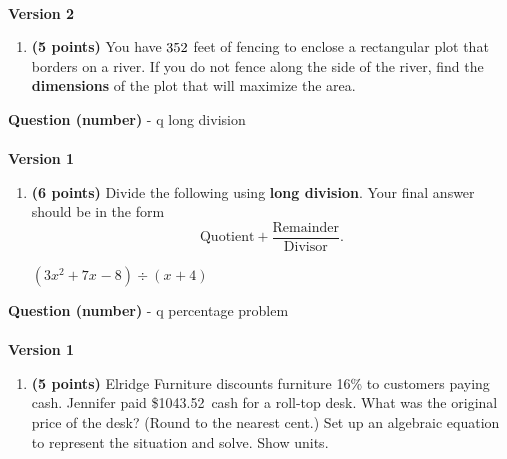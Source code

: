 \documentclass[12pt]{amsart}
\begin{document}
\begin{enumerate}[resume]
  
\vfill \vfill \vfill
 \end{enumerate}$ $ \\ {\bf Version 2} \\\begin{enumerate}[resume]
\item {\bf (5 points)} 
 You have $352$ feet of fencing to enclose a rectangular plot that borders on a river. If you do not fence along the side of the river, find the \textbf{dimensions} of the plot that will maximize the area. \\

  
\vfill \vfill \vfill
 \end{enumerate}\newpage\def \a{4}\def \b{3}\def \c{-5}\def \r{12}\def \monicpol{x^{}+4}\def \longnbad{3x^{2}+7x^{}-8}\def \anspol{3x^{}-5}{\Large{\bf Question (number)}} - q long division\\ $ $ \\ {\bf Version 1} \\\begin{enumerate}[resume]
\item {\bf (6 points)} 
 Divide the following using {\bf long division}. Your final answer should be in the form $$ \text{Quotient} + \dfrac{\text{Remainder}}{\text{Divisor}}.$$

\vspace{3mm}

$(\longnbad) \div (\monicpol)$

\vfill  \vfill \vfill
 \end{enumerate}\newpage\newpage\def \discount{16}\def \paid{1043.52}\def \rainy{14.27}\def \orcost{1242.29}\def \purcost{899.59}\def \orrainy{16.99}{\Large{\bf Question (number)}} - q percentage problem\\ $ $ \\ {\bf Version 1} \\\begin{enumerate}[resume]
\item {\bf (5 points)} 
 Elridge Furniture discounts furniture \discount\% to customers paying cash. Jennifer paid \$\paid\ cash for a roll-top desk. What was the original price of the desk? (Round to the nearest cent.) Set up an algebraic equation to represent the situation and solve. Show units.


\end{enumerate}
\end{document}
